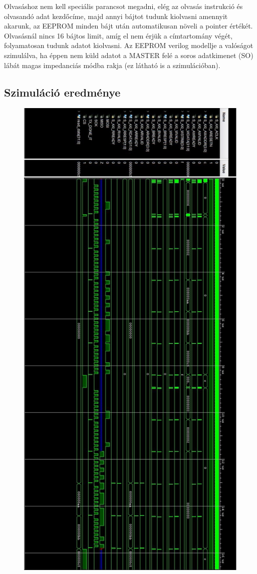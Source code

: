 \documentclass[a4paper,11pt]{article}
\begin{document}
Olvasáshoz nem kell speciális parancsot megadni, elég az olvasás instrukció és olvasandó adat kezdőcíme, majd annyi bájtot tudunk kiolvasni amennyit akarunk, az EEPROM minden bájt után automatikusan növeli a pointer értékét. Olvasásnál nincs 16 bájtos limit, amíg el nem érjük a címtartomány végét, folyamatosan tudunk adatot kiolvasni. Az EEPROM verilog modellje a valóságot szimulálva, ha éppen nem küld adatot a MASTER felé a soros adatkimenet (SO) lábát magas impedanciás módba rakja (ez látható is a szimulációban).

\subsection{Szimuláció eredménye}

\begin{figure}[H]
	\begin{center}
	\includegraphics[scale=0.6]{sim_complete.JPG}

\end{center}
\end{figure}
\end{document}
